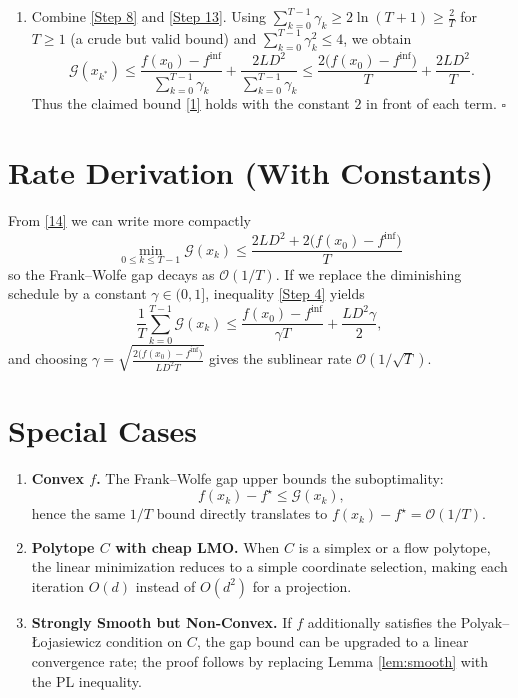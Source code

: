 \documentclass{article}
\begin{document}
\begin{enumerate}
Since the left‑hand side is a convex combination of the gaps,
\[
\exists\,k^{*}\in\{0,\dots,T-1\}\quad\text{s.t.}\quad 
\mathcal{G}(x_{k^{*}})\le
\frac{\sum_{k=0}^{T-1}\gamma_{k}\mathcal{G}(x_{k})}{\sum_{k=0}^{T-1}\gamma_{k}}.
\tag{13}
\]

\item[Step 9.] Combine \eqref{Step 8} and \eqref{Step 13}. Using $\sum_{k=0}^{T-1}\gamma_{k}\ge 2\ln(T+1)\ge \frac{2}{T}$ for $T\ge1$ (a crude but valid bound) and $\sum_{k=0}^{T-1}\gamma_{k}^{2}\le 4$, we obtain
\[
\mathcal{G}(x_{k^{*}})
   \le \frac{f(x_{0})-f^{\inf}}{\sum_{k=0}^{T-1}\gamma_{k}}
        + \frac{2L D^{2}}{\sum_{k=0}^{T-1}\gamma_{k}}
   \le \frac{2\bigl(f(x_{0})-f^{\inf}\bigr)}{T}
        + \frac{2L D^{2}}{T}. \tag{14}
\]
Thus the claimed bound \eqref{1} holds with the constant $2$ in front of each term. \hfill $\square$

\end{enumerate}

\section*{Rate Derivation (With Constants)}
From \eqref{14} we can write more compactly
\[
\boxed{\;
\min_{0\le k\le T-1}\mathcal{G}(x_{k})
   \le \frac{2L D^{2}+2\bigl(f(x_{0})-f^{\inf}\bigr)}{T}
\;}
\]
so the Frank–Wolfe gap decays as $\mathcal{O}(1/T)$.  
If we replace the diminishing schedule by a constant $\gamma\in(0,1]$, inequality \eqref{Step 4} yields
\[
\frac{1}{T}\sum_{k=0}^{T-1}\mathcal{G}(x_{k})
   \le \frac{f(x_{0})-f^{\inf}}{\gamma T}
        + \frac{L D^{2}\gamma}{2},
\]
and choosing $\gamma=\sqrt{\frac{2\bigl(f(x_{0})-f^{\inf}\bigr)}{L D^{2}T}}$ gives the sublinear rate $\mathcal{O}(1/\sqrt{T})$.

\section*{Special Cases}
\begin{enumerate}[leftmargin=*]
\item \textbf{Convex $f$.} The Frank–Wolfe gap upper bounds the suboptimality:
\[
f(x_{k})-f^{\star}\le \mathcal{G}(x_{k}),
\]
hence the same $1/T$ bound directly translates to $f(x_{k})-f^{\star}= \mathcal{O}(1/T)$.
\item \textbf{Polytope $C$ with cheap LMO.} When $C$ is a simplex or a flow polytope, the linear minimization reduces to a simple coordinate selection, making each iteration $O(d)$ instead of $O(d^{2})$ for a projection.
\item \textbf{Strongly Smooth but Non‑Convex.} If $f$ additionally satisfies the Polyak–Łojasiewicz condition on $C$, the gap bound can be upgraded to a linear convergence rate; the proof follows by replacing Lemma \ref{lem:smooth} with the PL inequality.
\end{enumerate}
\end{document}
